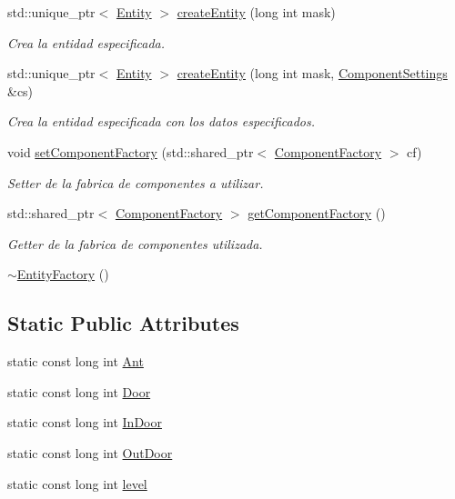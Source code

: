 \begin{DoxyCompactItemize}
std\+::unique\+\_\+ptr$<$ \hyperlink{classant_1_1_entity}{Entity} $>$ \hyperlink{classant_1_1_entity_factory_af02c81d4a737ee3d8ddf6f68ad43deb6}{create\+Entity} (long int mask)
\begin{DoxyCompactList}\small\item\em Crea la entidad especificada. \end{DoxyCompactList}\item 
std\+::unique\+\_\+ptr$<$ \hyperlink{classant_1_1_entity}{Entity} $>$ \hyperlink{classant_1_1_entity_factory_afef96c25d362db4fba4648e1520b98d5}{create\+Entity} (long int mask, \hyperlink{classant_1_1_component_settings}{Component\+Settings} \&cs)
\begin{DoxyCompactList}\small\item\em Crea la entidad especificada con los datos especificados. \end{DoxyCompactList}\item 
void \hyperlink{classant_1_1_entity_factory_abf4a24df1840b8ed4a738873f68d8168}{set\+Component\+Factory} (std\+::shared\+\_\+ptr$<$ \hyperlink{classant_1_1_component_factory}{Component\+Factory} $>$ cf)
\begin{DoxyCompactList}\small\item\em Setter de la fabrica de componentes a utilizar. \end{DoxyCompactList}\item 
std\+::shared\+\_\+ptr$<$ \hyperlink{classant_1_1_component_factory}{Component\+Factory} $>$ \hyperlink{classant_1_1_entity_factory_a3562d6b2a68372465ec4518070b956d3}{get\+Component\+Factory} ()
\begin{DoxyCompactList}\small\item\em Getter de la fabrica de componentes utilizada. \end{DoxyCompactList}\item 
\hyperlink{classant_1_1_entity_factory_a66fee3669089d284296bbfed30e4ff00}{$\sim$\+Entity\+Factory} ()
\end{DoxyCompactItemize}
\subsection*{Static Public Attributes}
\begin{DoxyCompactItemize}
\item 
static const long int \hyperlink{classant_1_1_entity_factory_ac2b28957b185c60643889aafa36badff}{Ant}
\item 
static const long int \hyperlink{classant_1_1_entity_factory_a70d75e92457179951ac177df4814467e}{Door}
\item 
static const long int \hyperlink{classant_1_1_entity_factory_ad1648971a3f0d3d1ecade497a8e9a54e}{In\+Door}
\item 
static const long int \hyperlink{classant_1_1_entity_factory_a2b75fdbea2cc2348e0181380d1c9f7f1}{Out\+Door}
\item 
static const long int \hyperlink{classant_1_1_entity_factory_a94033dca09c55b92cc187e64c375c352}{level}
\end{DoxyCompactItemize}
